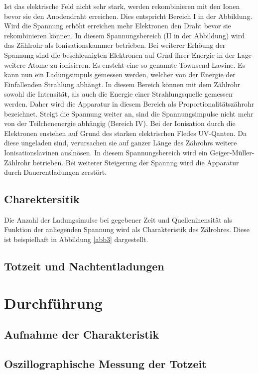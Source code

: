 \documentclass[11pt,ngerman,a4paper]{article}
\begin{document}
\noindent
Ist das elektrische Feld nicht sehr stark, werden rekombinieren mit den Ionen bevor sie den Anodendraht erreichen. Dies entspricht Bereich I in der Abbildung. Wird die Spannung erh\"oht erreichen mehr Elektronen den Draht bevor sie rekombinieren k\"onnen. In diesem Spannungsbereich (II in der Abbildung) wird das Z\"ahlrohr als Ionisationskammer betrieben. Bei weiterer Erh\"oung der Spannung sind  die beschleunigten Elektronen auf Grnd ihrer Energie in der Lage weitere Atome zu ionisieren. Es ensteht eine so genannte Townsend-Lawine. Es kann nun ein Ladungsimpuls gemessen werden, welcher von der Energie der Einfallenden Strahlung abh\"angt. In diesem Bereich k\"onnen mit dem Z\"ahlrohr sowohl die Intensit\"at, als auch die Energie einer Strahlungsquelle gemessen werden. Daher wird die Apparatur in diesem Bereich als Proportionalit\"atsz\"ahrohr bezeichnet. 
Steigt die Spannung weiter an, sind die Spannungsimpulse nicht mehr von der Teilchenenergie abh\"angig (Bereich IV). Bei der Ionisation durch die Elektronen enstehen auf Grund des starken elektrischen Fledes UV-Qanten. Da diese ungeladen sind, verursachen sie auf ganzer L\"ange des Z\"ahrohrs weitere Ionisationslavinen ausln\"osen. In diesem Spannungsbereich wird ein Geiger-M\"uller-Z\"ahlrohr betrieben. 
Bei weiterer Steigerung der Spannng wird die Apparatur durch Dauerentladungen zerst\"ort.
\subsection{Charektersitik}
Die Anzahl der Ladungsimulse bei gegebener Zeit und Quelleninensit\"at als Funktion der anliegenden Spannung wird als Charakteristik des Z\"alrohres. Diese ist beispielhaft in Abbildung \ref{abb3} dargestellt. 
\subsection{Totzeit und Nachtentladungen}

\section{Durchführung}
\subsection{Aufnahme der Charakteristik}
\subsection{Oszillographische Messung der Totzeit}
\end{document}
